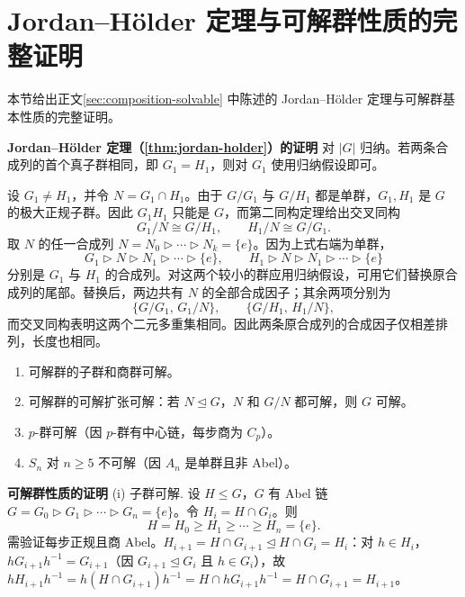 \section{Jordan--H\"older 定理与可解群性质的完整证明}
\label{sec:jordan-holder-proof}

本节给出正文\cref{sec:composition-solvable} 中陈述的 Jordan--H\"older 定理与可解群基本性质的完整证明。

\par\medskip
\noindent\textbf{Jordan--H\"older 定理（\cref{thm:jordan-holder}）的证明}\quad
对 $|G|$ 归纳。若两条合成列的首个真子群相同，即 $G_1=H_1$，则对 $G_1$ 使用归纳假设即可。

设 $G_1\ne H_1$，并令 $N=G_1\cap H_1$。由于 $G/G_1$ 与 $G/H_1$ 都是单群，$G_1,H_1$ 是 $G$ 的极大正规子群。因此 $G_1H_1$ 只能是 $G$，而第二同构定理给出交叉同构
\[
G_1/N\cong G/H_1,\qquad H_1/N\cong G/G_1.
\]
取 $N$ 的任一合成列 $N=N_0\rhd\cdots\rhd N_k=\{e\}$。因为上式右端为单群，
\[
G_1\rhd N\rhd N_1\rhd\cdots\rhd\{e\},\qquad
H_1\rhd N\rhd N_1\rhd\cdots\rhd\{e\}
\]
分别是 $G_1$ 与 $H_1$ 的合成列。对这两个较小的群应用归纳假设，可用它们替换原合成列的尾部。替换后，两边共有 $N$ 的全部合成因子；其余两项分别为
\[
\{G/G_1,\,G_1/N\},\qquad \{G/H_1,\,H_1/N\},
\]
而交叉同构表明这两个二元多重集相同。因此两条原合成列的合成因子仅相差排列，长度也相同。
\par\medskip

\begin{proposition}[可解群的基本性质]
\begin{enumerate}[label=(\roman*),leftmargin=3em]
\item 可解群的子群和商群可解。
\item 可解群的可解扩张可解：若 $N\mathrel{\trianglelefteq} G$，$N$ 和 $G/N$ 都可解，则 $G$ 可解。
\item $p$-群可解（因 $p$-群有中心链，每步商为 $C_p$）。
\item $S_n$ 对 $n\ge5$ 不可解（因 $A_n$ 是单群且非 Abel）。
\end{enumerate}
\end{proposition}

\par\medskip
\noindent\textbf{可解群性质的证明}\quad
(i) 子群可解. 设 $H\le G$，$G$ 有 Abel 链 $G=G_0\rhd G_1\rhd\cdots\rhd G_n=\{e\}$。令 $H_i=H\cap G_i$。则
\[
H=H_0\ge H_1\ge\cdots\ge H_n=\{e\}.
\]
需验证每步正规且商 Abel。$H_{i+1}=H\cap G_{i+1}\mathrel{\trianglelefteq} H\cap G_i=H_i$：对 $h\in H_i$，$hG_{i+1}h^{-1}=G_{i+1}$（因 $G_{i+1}\mathrel{\trianglelefteq} G_i$ 且 $h\in G_i$），故 $hH_{i+1}h^{-1}=h(H\cap G_{i+1})h^{-1}=H\cap hG_{i+1}h^{-1}=H\cap G_{i+1}=H_{i+1}$。

